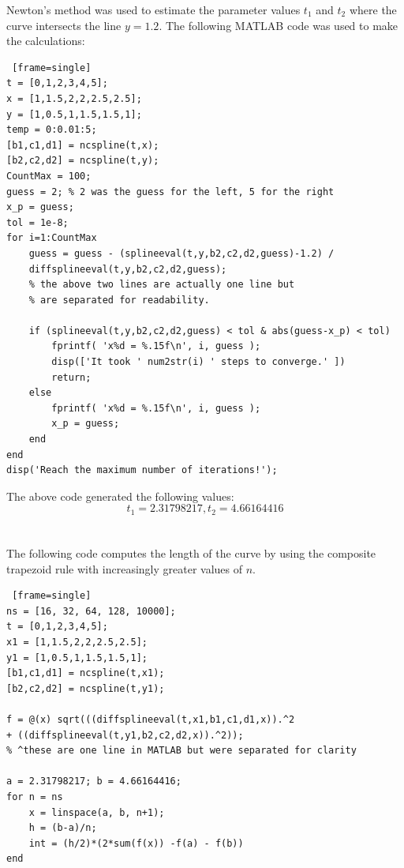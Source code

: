 \documentclass[paper=a4, fontsize=11pt]{scrartcl} %
\numberwithin{equation}{section} %
\numberwithin{figure}{section} %
\numberwithin{table}{section} %
\begin{document}
Newton's method was used to estimate the parameter values $t_1$ and $t_2$ where the curve intersects the line $y = 1.2$.  The following MATLAB code was used to make the calculations:

\begin{lstlisting} [frame=single]
t = [0,1,2,3,4,5];
x = [1,1.5,2,2,2.5,2.5];
y = [1,0.5,1,1.5,1.5,1];
temp = 0:0.01:5;
[b1,c1,d1] = ncspline(t,x);
[b2,c2,d2] = ncspline(t,y);
CountMax = 100;
guess = 2; % 2 was the guess for the left, 5 for the right
x_p = guess;
tol = 1e-8;
for i=1:CountMax
	guess = guess - (splineeval(t,y,b2,c2,d2,guess)-1.2) / 
    diffsplineeval(t,y,b2,c2,d2,guess); 
    % the above two lines are actually one line but 
    % are separated for readability.  
	
	if (splineeval(t,y,b2,c2,d2,guess) < tol & abs(guess-x_p) < tol)
	    fprintf( 'x%d = %.15f\n', i, guess );
	    disp(['It took ' num2str(i) ' steps to converge.' ])
	    return;
	else
	    fprintf( 'x%d = %.15f\n', i, guess );
	    x_p = guess;
	end
end
disp('Reach the maximum number of iterations!');
\end{lstlisting}

The above code generated the following values:
$$t_1 = 2.31798217, t_2 = 4.66164416$$



\bigskip
\bigskip
\bigskip
\bigskip
\bigskip
\bigskip
\bigskip
\bigskip
\bigskip
\bigskip

\section{}


The following code computes the length of the curve by using the composite trapezoid rule with increasingly greater values of $n$.  

\begin{lstlisting} [frame=single]
ns = [16, 32, 64, 128, 10000];
t = [0,1,2,3,4,5];
x1 = [1,1.5,2,2,2.5,2.5];
y1 = [1,0.5,1,1.5,1.5,1];
[b1,c1,d1] = ncspline(t,x1);
[b2,c2,d2] = ncspline(t,y1);

f = @(x) sqrt(((diffsplineeval(t,x1,b1,c1,d1,x)).^2
+ ((diffsplineeval(t,y1,b2,c2,d2,x)).^2));
% ^these are one line in MATLAB but were separated for clarity

a = 2.31798217; b = 4.66164416;
for n = ns
    x = linspace(a, b, n+1);
    h = (b-a)/n;
    int = (h/2)*(2*sum(f(x)) -f(a) - f(b))
end
\end{lstlisting}
\end{document}
